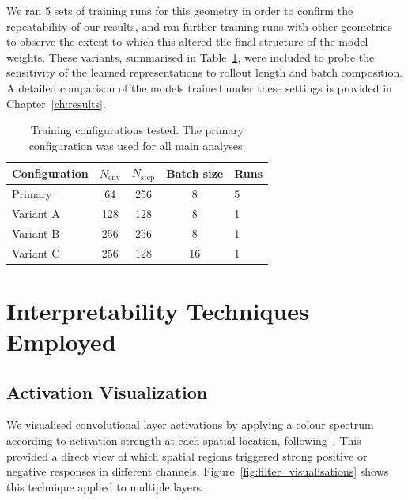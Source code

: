     We ran 5 sets of training runs for this geometry in order to confirm the repeatability of our results, and ran further training runs with other geometries to observe the extent to which this altered the final structure of the model weights. These variants, summarised in Table~\ref{tab:training_configs}, were included to probe the sensitivity of the learned representations to rollout length and batch composition. A detailed comparison of the models trained under these settings is provided in Chapter~\ref{ch:results}.

    \begin{table}[h]
    \centering
    \caption[Training configurations]{Training configurations tested. The primary configuration was used for all main analyses.}
    \label{tab:training_configs}
    \begin{tabular}{lcccl}
    \toprule
    \textbf{Configuration} & $N_{\text{env}}$ & $N_{\text{step}}$ & \textbf{Batch size} & \textbf{Runs} \\
    \midrule
    Primary & 64 & 256 & 8 & 5 \\
    Variant A & 128 & 128 & 8 & 1 \\
    Variant B & 256 & 256 & 8 & 1 \\
    Variant C & 256 & 128 & 16 & 1 \\
    \bottomrule
    \end{tabular}
    \end{table}

\section{Interpretability Techniques Employed}
\label{sec:interp_techniques}

\subsection{Activation Visualization}
    \label{subsec:feature_viz}
    We visualised convolutional layer activations by applying a colour spectrum according to activation strength at each spatial location, following~\citet{mini_2023_understanding}. This provided a direct view of which spatial regions triggered strong positive or negative responses in different channels. Figure~\ref{fig:filter_visualisations} shows this technique applied to multiple layers.


